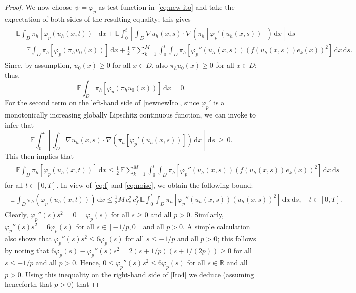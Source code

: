 \documentclass[12pt]{article}
\newcommand{\dd}{\,\mathrm{d}}
\begin{document}
{\begin{proof}
We now choose $\psi=\varphi_p$ as test function in~\eqref{eq:new-ito} and take the expectation of both sides of the resulting equality; this gives
\begin{align}
\begin{aligned}\label{newnewIto}
&\mathbb{E}\int_D \pi_h[\varphi_p(u_h(x,t))] \dd x +\mathbb{E} \int_0^t \left[\int_D \nabla u_h(x,s) \cdot \nabla \left(\pi_h[\varphi_p'(u_h(x,s))]\right) \dd x \right]\! \dd s\\
&\,= \mathbb{E}\int_D \pi_h[\varphi_p(\pi_h u_0(x))] \dd x + \frac{1}{2} \,\mathbb{E}
\sum_{k=1}^M \int_0^t \int_D \pi_h[\varphi_p''(u_h(x,s))(f(u_h(x,s))e_k(x))^2]\dd x \dd s.
\end{aligned}
\end{align}
%
Since, by assumption,  $u_0(x)\geq 0$ for all $x \in \overline{D}$, also $\pi_h u_0(x) \geq 0$ for all $x \in \overline{D}$; thus,
\[ \mathbb{E}\int_D \pi_h[\varphi_p(\pi_h u_0(x))] \dd x = 0.\]
For the second term on the left-hand side of \eqref{newnewIto}, since $\varphi_p'$ is a monotonically increasing globally Lipschitz continuous function, we can invoke 
\cite[Lemma 4.1]{barrett2012finite}
to infer that
%
\[\mathbb{E} \int_0^t \left[\int_D \nabla u_h(x,s) \cdot \nabla \left(\pi_h[\varphi_p'(u_h(x,s))]\right) \!\dd x \right]\! \dd s\,\geq \,0.\]
%
This then implies that 
%
\begin{align*}\begin{aligned}
&\mathbb{E}\int_D \pi_h[\varphi_p(u_h(x,t))] \dd x \leq \frac{1}{2} \,\mathbb{E}
\sum_{k=1}^M \int_0^t \int_D \pi_h[\varphi_p''(u_h(x,s))(f(u_h(x,s))e_k(x))^2]\dd x \dd s
\end{aligned}
\end{align*}
for all $t \in [0,T]$.
In view of \eqref{eq:f} and \eqref{eq:noise}, we obtain the following bound: 
%
\begin{align}
\begin{aligned}\label{Ito4}
\mathbb{E}\, \int_D \pi_h (\varphi_p(u_h(x,t)))\dd x\leq \frac{1}{2} M\,c_e^2\, c_f^2 \,\mathbb{E}
\int_0^t \int_D \pi_h[\varphi_p''(u_h(x,s))(u_h(x,s))^2]\dd x \dd s,\quad t \in [0,T].
\end{aligned}
\end{align}
%
Clearly, $\varphi_p''(s)s^2 = 0 = \varphi_p(s)$ for all $s \geq 0$ and all $p > 0$. Similarly, $\varphi_p''(s)s^2 = 6\varphi_p(s)$ for all $s \in [-1/p,0]$ and all $p > 0$. A simple calculation also shows that $\varphi_p''(s)s^2 \leq 6 \varphi_p(s)$ for all $s \leq -1/p$ and all $p > 0$; this follows by noting that $6 \varphi_p(s) - \varphi_p''(s)s^2 = 2(s+1/p)(s+1/(2p)) \geq 0$ for all $s\leq -1/p$ and all $p > 0$. Hence, $0 \leq \varphi_p''(s)s^2 \leq 6 \varphi_p(s)$ for all $s \in \mathbb{R}$ and all $p > 0$. Using this inequality on the right-hand side of \eqref{Ito4} we deduce (assuming henceforth that $p > 0$) that

\end{proof}}
\end{document}
